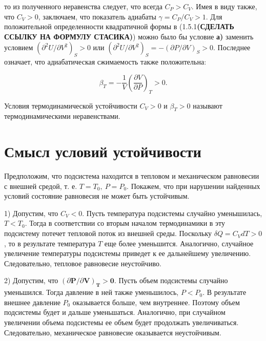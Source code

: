 \documentclass[a4paper,14pt]{article} %
\begin{document}
то из полученного неравенства следует, что всегда $C_{P}>C_{V} .$ Имея в виду также, что $C_{V}>0$, заключаем, что показатель адиабаты $\gamma=C_{P} / C_{V}>1 .$ Для положительной определенности квадратичной формы в (1.5.1\textbf{(СДЕЛАТЬ ССЫЛКУ НА ФОРМУЛУ СТАСИКА)}) можно было бы условие \textbf{а)} заменить условием $\left(\partial^{2} U / \partial V^{2}\right)_{S}>0$ или $\left(\partial^{2} U / \partial V^{2}\right)_{S}=-(\partial P / \partial V)_{S}>0 .$ Последнее означает, что адиабатическая сжимаемость также положительна:

\begin{equation*}
\beta_{T}=-\frac{1}{V}\left(\frac{\partial V}{\partial P}\right)_{T}>0.
\end{equation*}

Условия термодинамической устойчивости $C_V > 0$ и $\beta_{T} > 0$ называют 
термодинамическими неравенствами.

\section{Смысл условий устойчивости}

\hskip 5mm Предположим, что подсистема находится в тепловом и механическом равновесии с внешней средой, т. е. $T=T_{0},\ P=P_{0} .$ Покажем, что при нарушении найденных условий состояние равновесия не может быть устойчивым.

1) Допустим, что $C_{V}<0 .$ Пусть температура подсистемы случайно уменышилась, $T<T_{0} .$ Тогда в соответствии со вторым началом термодинамики в эту подсистему потечет тепловой поток из внешней среды. Поскольку $\delta Q=C_{V} d T>0$, то в результате температура $T$ еще более уменьшится. Аналогично, случайное увеличение температуры подсистемы приведет к ее дальнейшему увеличению. Следовательно, тепловое равновесие неустойчиво.

2) Допустим, что $(\partial \boldsymbol{P} / \partial \boldsymbol{V})_{\boldsymbol{T}}>\mathbf{0 .}$ Пусть объем подсистемы случайно уменьшился. Тогда давление в ней также уменьшилось, $P<P_{0} .$ В результате внешнее давление $P_{0}$ оказывается больше, чем внутреннее. Поэтому объем подсистемы будет и дальше уменьшаться. Аналогично, при случайном увеличении объема подсистемы ее объем будет продолжать увеличиваться. Следовательно, механическое равновесие оказывается неустойчивым.
\end{document}
